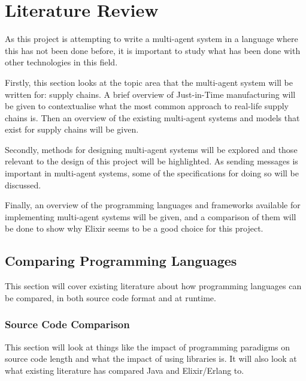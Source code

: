 \section{Literature Review}

As this project is attempting to write a multi-agent system in a language where this has not been done before, it is important to study what has been done with other technologies in this field.

Firstly, this section looks at the topic area that the multi-agent system will be written for: supply chains.
A brief overview of Just-in-Time manufacturing will be given to contextualise what the most common approach to real-life supply chains is.
Then an overview of the existing multi-agent systems and models that exist for supply chains will be given.

Secondly, methods for designing multi-agent systems will be explored and those relevant to the design of this project will be highlighted.
As sending messages is important in multi-agent systems, some of the specifications for doing so will be discussed.

Finally, an overview of the programming languages and frameworks available for implementing multi-agent systems will be given, and a comparison of them will be done to show why Elixir seems to be a good choice for this project.







\subsection{Comparing Programming Languages}

This section will cover existing literature about how programming languages can be compared, in both source code format and at runtime.

\subsubsection{Source Code Comparison}

This section will look at things like the impact of programming paradigms on source code length and what the impact of using libraries is.
It will also look at what existing literature has compared Java and Elixir/Erlang to.

